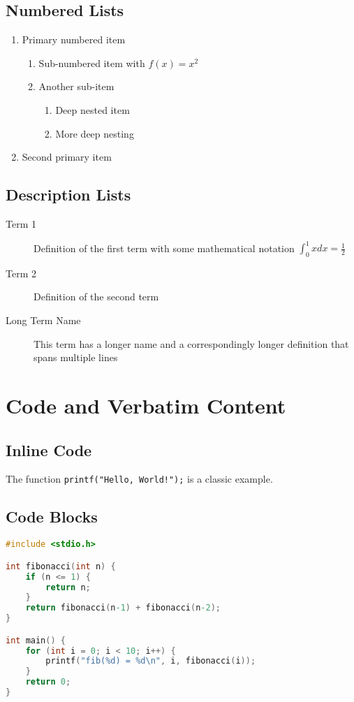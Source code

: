\documentclass[12pt]{article}
\newcommand{\code}[1]{\texttt{#1}}
\begin{document}
\subsection{Numbered Lists}
\begin{enumerate}
\item Primary numbered item
\begin{enumerate}
\item Sub-numbered item with $f(x) = x^2$
\item Another sub-item
\begin{enumerate}
\item Deep nested item
\item More deep nesting
\end{enumerate}
\end{enumerate}
\item Second primary item
\end{enumerate}

\subsection{Description Lists}
\begin{description}
\item[Term 1] Definition of the first term with some mathematical notation $\int_0^1 x dx = \frac{1}{2}$
\item[Term 2] Definition of the second term
\item[Long Term Name] This term has a longer name and a correspondingly longer definition that spans multiple lines
\end{description}

\section{Code and Verbatim Content}

\subsection{Inline Code}
The function \code{printf("Hello, World!");} is a classic example.

\subsection{Code Blocks}
\begin{lstlisting}[language=C]
#include <stdio.h>

int fibonacci(int n) {
    if (n <= 1) {
        return n;
    }
    return fibonacci(n-1) + fibonacci(n-2);
}

int main() {
    for (int i = 0; i < 10; i++) {
        printf("fib(%d) = %d\n", i, fibonacci(i));
    }
    return 0;
}
\end{lstlisting}
\end{document}
